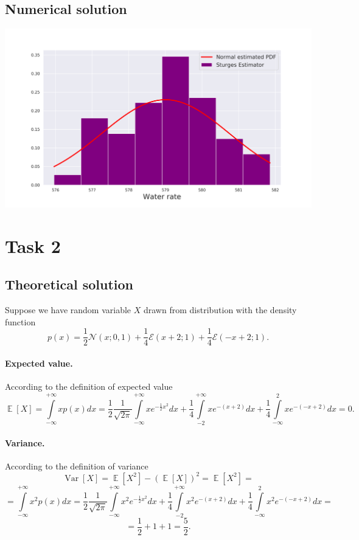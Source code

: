 \documentclass[a4paper, 12pt]{article}
\DeclareMathOperator*{\E}{\mathbb{E}}
\DeclareMathOperator*{\Var}{\text{Var}}
\begin{document}
\subsection{Numerical solution}
\includegraphics[width=\textwidth]{Images/Task1_1.png}

\section{Task 2}
\subsection{Theoretical solution}
Suppose we have random variable $X$ drawn from distribution with the density function 
\begin{equation}
\label{eq2_1}
p(x) = \dfrac{1}{2} \mathcal{N}(x; 0, 1) + \dfrac{1}{4} \mathcal{E}(x+2; 1) + \dfrac{1}{4} \mathcal{E}(-x+2; 1).
\end{equation}
\paragraph{Expected value.} According to the definition of expected value
$$
\E [X] = \int \limits_{- \infty}^{+\infty} x p(x) dx = \dfrac{1}{2} \dfrac{1}{\sqrt{2 \pi}} \int \limits_{-\infty}^{+\infty} xe^{-\frac{1}{2}x^2} dx + \dfrac{1}{4} \int \limits_{-2}^{+\infty} xe^{-(x+2)} dx + \dfrac{1}{4} \int \limits_{-\infty}^{2} xe^{-(-x+2)} dx = 0.
$$
\paragraph{Variance.} According to the definition of variance
$$
\Var [X] = \E [X^2] - (\E [X])^2 = \E[X^2] = 
$$
$$
= \int \limits_{- \infty}^{+\infty} x^2 p(x) dx = \dfrac{1}{2} \dfrac{1}{\sqrt{2 \pi}} \int \limits_{-\infty}^{+\infty} x^2e^{-\frac{1}{2}x^2} dx + \dfrac{1}{4} \int \limits_{-2}^{+\infty} x^2e^{-(x+2)} dx + \dfrac{1}{4} \int \limits_{-\infty}^{2} x^2e^{-(-x+2)} dx =
$$
$$
= \dfrac{1}{2} + 1 + 1 = \dfrac{5}{2}.
$$
\end{document}

